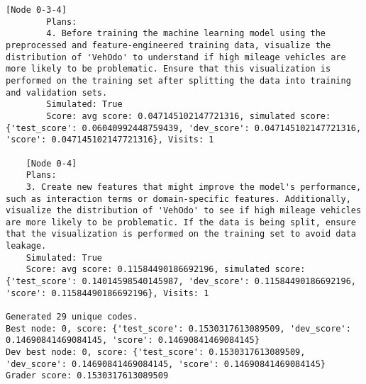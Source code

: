 \begin{lstlisting}[style=txtfile]
		[Node 0-3-4]
		Plans: 
		4. Before training the machine learning model using the preprocessed and feature-engineered training data, visualize the distribution of 'VehOdo' to understand if high mileage vehicles are more likely to be problematic. Ensure that this visualization is performed on the training set after splitting the data into training and validation sets.
		Simulated: True
		Score: avg score: 0.047145102147721316, simulated score: {'test_score': 0.06040992448759439, 'dev_score': 0.047145102147721316, 'score': 0.047145102147721316}, Visits: 1

	[Node 0-4]
	Plans: 
	3. Create new features that might improve the model's performance, such as interaction terms or domain-specific features. Additionally, visualize the distribution of 'VehOdo' to see if high mileage vehicles are more likely to be problematic. If the data is being split, ensure that the visualization is performed on the training set to avoid data leakage.
	Simulated: True
	Score: avg score: 0.11584490186692196, simulated score: {'test_score': 0.14014598540145987, 'dev_score': 0.11584490186692196, 'score': 0.11584490186692196}, Visits: 1

Generated 29 unique codes.
Best node: 0, score: {'test_score': 0.1530317613089509, 'dev_score': 0.14690841469084145, 'score': 0.14690841469084145}
Dev best node: 0, score: {'test_score': 0.1530317613089509, 'dev_score': 0.14690841469084145, 'score': 0.14690841469084145}
Grader score: 0.1530317613089509
\end{lstlisting}
